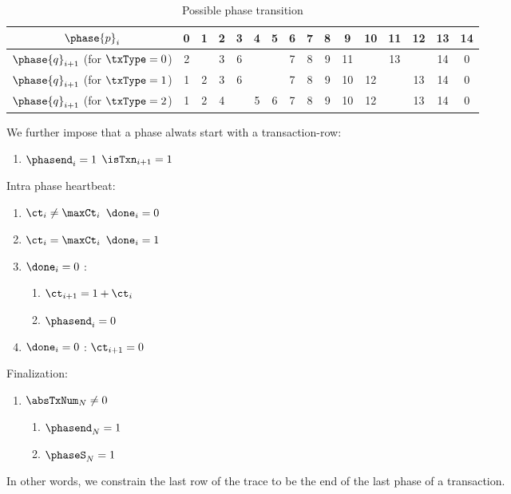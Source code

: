\begin{table}[h]
    \centering
    \begin{tabular}{|c|c|c|c|c|c|c|c|c|c|c|c|c|c|c|c|} \hline
        $\phase{p}_{i}$                         & 0 & 1 & 2 & 3 & 4 & 5 & 6 & 7 & 8 & 9  & 10 & 11 & 12 & 13 & 14 \\ \hline \hline
        $\phase{q}_{i + 1}$ (for $\txType = 0$) & 2 &   & 3 & 6 &   &   & 7 & 8 & 9 & 11 &    & 13 &    & 14 & 0  \\ \hline
        $\phase{q}_{i + 1}$ (for $\txType = 1$) & 1 & 2 & 3 & 6 &   &   & 7 & 8 & 9 & 10 & 12 &    & 13 & 14 & 0  \\ \hline
        $\phase{q}_{i + 1}$ (for $\txType = 2$) & 1 & 2 & 4 &   & 5 & 6 & 7 & 8 & 9 & 10 & 12 &    & 13 & 14 & 0  \\ \hline
    \end{tabular}
    \caption{Possible phase transition}
    \label{tab:Possible phase transition}
\end{table}

We further impose that a phase alwats start with a transaction-row:
\begin{enumerate}[resume]
    \item $\phasend_{i} = 1$ \Then $\isTxn_{i+1} = 1$
\end{enumerate}

Intra phase heartbeat:
\begin{enumerate}[resume]
    \item \If $\ct_{i} \neq \maxCt_{i}$ \Then $\done_{i} = 0$
    \item \If $\ct_{i} =    \maxCt_{i}$ \Then $\done_{i} = 1$
    \item \If $\done_{i} = 0$ \Then:
    \begin{enumerate}
        \item $\ct_{i+1} = 1 + \ct_{i}$ 
        \item $\phasend_{i} = 0$
    \end{enumerate}
    \item \If $\done_{i} = 0$ \Then: $\ct_{i+1} = 0$
\end{enumerate}

Finalization:
\begin{enumerate}[resume]
    \item \If $\absTxNum_{N} \neq 0$ \Then
    \begin{enumerate}
        \item $\phasend_{N} = 1$
        \item $\phaseS_{N} = 1$ 
    \end{enumerate}
\end{enumerate}
In other words, we constrain the last row of the trace to be the end of the last phase of a transaction.
